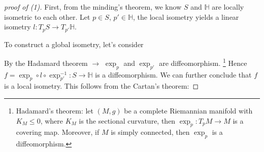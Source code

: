 \begin{proof}[proof of (1)]
    First, from the minding's theorem, we know \(S\) and \(\mathbb{H}\)
    are locally isometric to each other. Let \(p\in S\), \(p'
    \in \mathbb{H}\), the local isometry yields a linear isometry
    \(l\colon T_p S\to T_{p'} \mathbb{H}\).

    To construct a global isometry, let's consider
    \begin{center}
    \end{center}
    By the Hadamard theorem \(\rightarrow\) \(\exp_p\) and \(\exp_{p'}\)
    are diffeomorphism.
    \footnote{
        Hadamard's theorem: let \((M,g)\) be a complete Riemannian manifold
        with \(K_M\le 0\), where \(K_M\) is the sectional curvature, then
        \(\exp_p\colon T_p M\to M\) is a covering map. Moreover, if \(M\)
        is simply connected, then \(\exp_p\) is a diffeomorphism.
    }
    Hence \(f=\exp_p\circ l\circ \exp_{p'}^{-1}\colon S\to \mathbb{H}\)
    is a diffeomorphism. We can further conclude that \(f\) is a local 
    isometry. This follows from the Cartan's theorem:
\end{proof}
